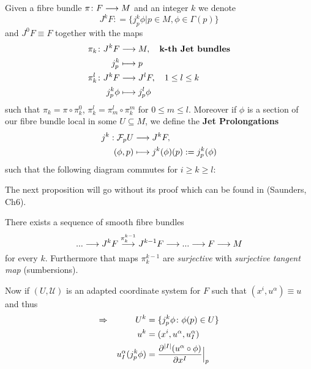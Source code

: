 \begin{definition}
  Given a fibre bundle $\pi\colon  F\longrightarrow M$ and an integer $k$ we denote
  $$ J^k F \colon = \{j^k_p \phi | p \in M, \phi \in \Gamma(p) \}$$
  and $J^0 F \equiv F$ together with the maps
  \begin{align}
    \pi_k \colon  J^k F &\lra M, \quad \textbf{k-th Jet bundles}\\
    j^k_p &\lmap p \\
    \pi^l_k\colon  J^kF &\lra J^l F, \quad 1 \leq l \leq k \\
    j^k_p  \phi &\lmap j^l_p \phi
  \end{align}
  such that $\pi_k = \pi \circ \pi^0_k$, $\pi^l_k = \pi^l_m \circ \pi^m_k$ for $0 \leq m \leq l$. Moreover if $\phi$ is a section of our fibre bundle local in some $U\subseteq M$, we define the \textbf{Jet Prolongations}
  \begin{align}
    j^k: \mathcal{F}_p U &\lra J^k F,\\
    (\phi, p) &\lmap j^k(\phi)(p) := j^k_p(\phi)
  \end{align}
  such that the following diagram commutes for $i \geq k \geq l$:
  \begin{center}
  \end{center}
\end{definition}

The next proposition will go without its proof which can be found in (Saunders, Ch6). %

\begin{prop}
 There exists a sequence of smooth fibre bundles
 $$ ... \longrightarrow J^kF \overset{\pi^{k-1}_k}{\longrightarrow} J^{k-1}F \longrightarrow ... \longrightarrow F \longrightarrow M $$
 for every $k$. Furthermore that maps $\pi^{k-1}_k$ are \emph{surjective} with \emph{surjective tangent map} (sumbersions).
\end{prop}

Now if $(U, \mathcal{U})$ is an adapted coordinate system for $F$ such that $(x^i, u^\alpha) \equiv u$ and thus
\begin{align}
  \Rightarrow \quad \quad \quad U^k &= \{j^k_p \phi \colon  \phi(p) \in U\}\\
  u^k &= (x^i, u^\alpha, u_I^\alpha)\\
  u^\alpha_I(j^k_p \phi) &= \dell{^{|I|} (u^\alpha \circ \phi)}{x^I}\Big|_p
\end{align}

